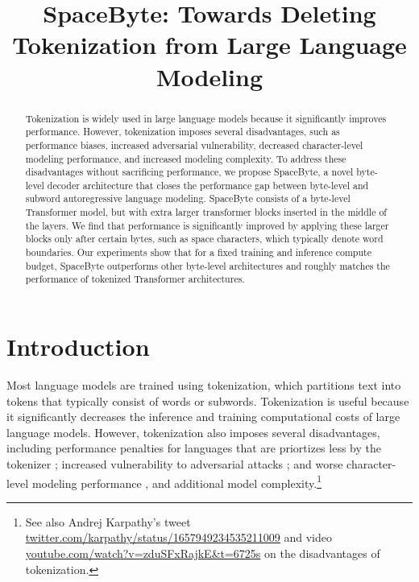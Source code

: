 \title{SpaceByte: Towards Deleting Tokenization from Large Language Modeling}

\begin{abstract}
Tokenization is widely used in large language models because it significantly improves performance. However, tokenization imposes several disadvantages, such as performance biases, increased adversarial vulnerability, decreased character-level modeling performance, and increased modeling complexity. To address these disadvantages without sacrificing performance, we propose SpaceByte, a novel byte-level decoder architecture that closes the performance gap between byte-level and subword autoregressive language modeling. SpaceByte consists of a byte-level Transformer model, but with extra larger transformer blocks inserted in the middle of the layers. We find that performance is significantly improved by applying these larger blocks only after certain bytes, such as space characters, which typically denote word boundaries. Our experiments show that for a fixed training and inference compute budget, SpaceByte outperforms other byte-level architectures and roughly matches the performance of tokenized Transformer architectures.
\end{abstract}

\section{Introduction}

Most language models are trained using tokenization, which partitions text into tokens that typically consist of words or subwords. Tokenization is useful because it significantly decreases the inference and training computational costs of large language models. However, tokenization also imposes several disadvantages, including performance penalties for languages that are priortizes less by the tokenizer \cite{sharami2023,petrov2023language,ahia2023languages}; increased vulnerability to adversarial attacks \cite{solidGoldMagikarp}; and worse character-level modeling performance \cite{welinder2022tweet,mambabyte}, and additional model complexity.\footnote{
    See also Andrej Karpathy's tweet \href{https://twitter.com/karpathy/status/1657949234535211009}{twitter.com/karpathy/status/1657949234535211009}
    and video \href{https://www.youtube.com/watch?v=zduSFxRajkE&t=6725s}{youtube.com/watch?v=zduSFxRajkE\&t=6725s} on the disadvantages of tokenization.}

